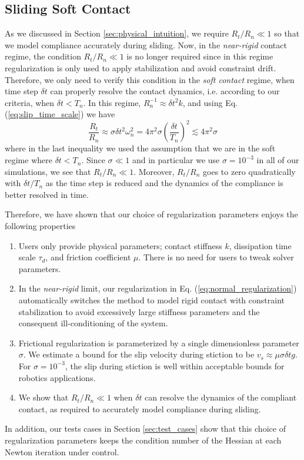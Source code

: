 \subsection{Sliding Soft Contact}

As we discussed in Section \ref{sec:physical_intuition}, we require $R_t/R_n\ll
1$ so that we model compliance accurately during sliding. Now, in the
\emph{near-rigid} contact regime, the condition $R_t/R_n\ll 1$ is no longer
required since in this regime regularization is only used to apply stabilization
and avoid constraint drift. Therefore, we only need to verify this condition in
the \emph{soft contact} regime, when time step $\delta t$ can properly resolve
the contact dynamics, i.e. according to our criteria, when $\delta t < T_n$. In
this regime, $R_n^{-1}\approx \delta t^2k$, and using Eq.
(\ref{eq:slip_time_scale}) we have
\begin{equation}
    \frac{R_t}{R_n}\approx \sigma \delta t^2 \omega_n^2=4\pi^2\sigma\left(\frac{\delta t}{T_n}\right)^2
    \lesssim 4\pi^2\sigma
    \label{eq:rtrn_ratio}
\end{equation}
where in the last inequality we used the assumption that we are in the soft
regime where $\delta t < T_n$. Since $\sigma \ll 1$ and in particular we
use $\sigma=10^{-3}$ in all of our simulations, we see that $R_t/R_n \ll
1$. Moreover, $R_t/R_n$ goes to zero quadratically with $\delta t/T_n$ as
the time step is reduced and the dynamics of the compliance is better resolved
in time.

Therefore, we have shown that our choice of regularization parameters enjoys the
following properties
\begin{enumerate}
    \item Users only provide physical parameters; contact stiffness $k$, dissipation time scale
    $\tau_d$, and friction coefficient $\mu$. There is no need for users to tweak
    solver parameters.
    \item In the \emph{near-rigid} limit, our regularization in
    Eq. (\ref{eq:normal_regularization}) automatically switches the method to
    model rigid contact with constraint stabilization to avoid excessively large
    stiffness parameters and the consequent ill-conditioning of the system.
    \item Frictional regularization is parameterized by a single dimensionless
    parameter $\sigma$. We estimate a bound for the slip velocity during
    stiction to be $v_s \approx \mu \sigma \delta t g$. For
    $\sigma=10^{-3}$, the slip during stiction is well within acceptable
    bounds for robotics applications.
    \item We show that $R_t/R_n \ll 1$ when $\delta t$ can resolve the dynamics
    of the compliant contact, as required to accurately model compliance during
    sliding.
\end{enumerate}

In addition, our tests cases in Section \ref{sec:test_cases} show that this
choice of regularization parameters keeps the condition number of the Hessian at
each Newton iteration under control.
